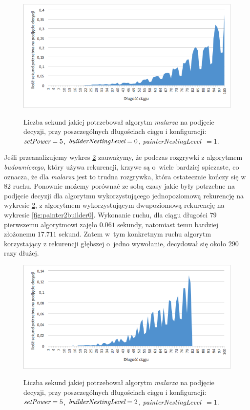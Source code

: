 \documentclass[document]{xmgr}
\begin{document}
\begin{figure}[tbh]
    \centering
    \caption{Liczba sekund jakiej potrzebował algorytm \emph{malarza} na podjęcie decyzji, przy poszczególnych długościach ciągu i konfiguracji: $\emph{setPower}=5$, $\emph{builderNestingLevel}=0$, \emph{painterNestingLevel}~$=1$.}
    \includegraphics[width = \textwidth]{images2/timePainter1Builder0}
    \label{fig:painter1builder0}
\end{figure}

Jeśli przeanalizujemy wykres \ref{fig:painter1builder2} zauważymy, że podczas rozgrywki z algorytmem \emph{budowniczego}, który używa rekurencji, krzywe są o~wiele bardziej spiczaste, co oznacza, że dla \emph{malarza} jest to trudna rozgrywka, która ostatecznie kończy się w~$82$ ruchu. Ponownie możemy porównać ze sobą czasy jakie były potrzebne na podjęcie decyzji dla algorytmu wykorzystującego jednopoziomową rekurencję na wykresie \ref{fig:painter1builder2}, z algorytmem wykorzystującym dwupoziomową rekurencję na wykresie \ref{fig:painter2builder0}. Wykonanie ruchu, dla ciągu długości $79$ pierwszemu algorytmowi zajęło $0.061$ sekundy, natomiast temu bardziej złożonemu $17.711$ sekund. Zatem w~tym konkretnym ruchu algorytm korzystający z rekurencji głębszej o~jedno wywołanie, decydował się około $290$ razy dłużej.



\begin{figure}[tbh]
    \centering
    \caption{Liczba sekund jakiej potrzebował algorytm \emph{malarza} na podjęcie decyzji, przy poszczególnych długościach ciągu i konfiguracji: $\emph{setPower}=5$, $\emph{builderNestingLevel}=2$, \emph{painterNestingLevel}~$=1$.}
    \includegraphics[width = \textwidth]{images2/timePainter1Builder2}
    \label{fig:painter1builder2}
\end{figure}
\end{document}
